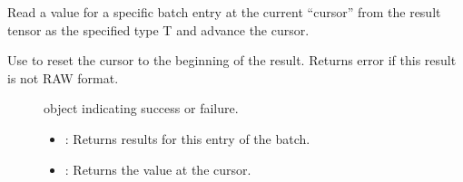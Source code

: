 \documentclass[letterpaper,10pt,english]{sphinxmanual}
\begin{document}
\begin{fulllineitems}
\begin{fulllineitems}
\label{\detokenize{cpp_api/classnvidia_1_1inferenceserver_1_1client_1_1InferContext_1_1Result:_CPPv4N6nvidia15inferenceserver6client12InferContext6Result14GetRawAtCursorE6size_tP1T}}%
\pysigstartmultiline
{}\label{\detokenize{cpp_api/classnvidia_1_1inferenceserver_1_1client_1_1InferContext_1_1Result:classnvidia_1_1inferenceserver_1_1client_1_1InferContext_1_1Result_1a64d951fd64068b9d2e3da103f47390fe}}%
\pysigstopmultiline
Read a value for a specific batch entry at the current “cursor” from the result tensor as the specified type T and advance the cursor. 

Use {\hyperref[\detokenize{cpp_api/classnvidia_1_1inferenceserver_1_1client_1_1InferContext_1_1Result:classnvidia_1_1inferenceserver_1_1client_1_1InferContext_1_1Result_1adb27437d415b569a3a4b7700c56002bf}]{}} to reset the cursor to the beginning of the result. Returns error if this result is not RAW format. \begin{description}
\item[{}] \leavevmode
{\hyperref[\detokenize{cpp_api/classnvidia_1_1inferenceserver_1_1client_1_1Error:classnvidia_1_1inferenceserver_1_1client_1_1Error}]{}} object indicating success or failure. 

\item[{}] \leavevmode\begin{itemize}
\item {} 
: Returns results for this entry of the batch. 

\item {} 
: Returns the value at the cursor. 

\end{itemize}

\end{description}


\end{fulllineitems}


\end{fulllineitems}
\end{document}
